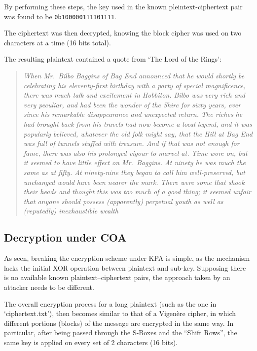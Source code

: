 \documentclass[12pt]{article}
\begin{document}
By performing these steps, the key used in the known pleintext-ciphertext pair was found to be \verb|0b100000111101111|.

The ciphertext was then decrypted, knowing the block cipher was used on two characters at a time (16 bits total).

The resulting plaintext contained a quote from `The Lord of the Rings':

\begin{quote}
   \textit{When Mr.\ Bilbo Baggins of Bag End announced that he would shortly be celebrating his eleventy-first birthday with a party of special magnificence, there was much talk and excitement in Hobbiton. 
   Bilbo was very rich and very peculiar, and had been the wonder of the Shire for sixty years, ever since his remarkable disappearance and unexpected return. 
   The riches he had brought back from his travels had now become a local legend, and it was popularly believed, whatever the old folk might say, that the Hill at Bag End was full of tunnels stuffed with treasure. 
   And if that was not enough for fame, there was also his prolonged vigour to marvel at. Time wore on, but it seemed to have little effect on Mr.\ Baggins.
   At ninety he was much the same as at fifty. 
   At ninety-nine they began to call him well-preserved, but unchanged would have been nearer the mark. 
   There were some that shook their heads and thought this was too much of a good thing; it seemed unfair that anyone should possess (apparently) perpetual youth as well as (reputedly) inexhaustible wealth}
\end{quote}

\subsection{Decryption under COA}
\label{sec:03.1}

As seen, breaking the encryption scheme under KPA is simple, as the mechanism lacks the initial XOR operation between plaintext and sub-key.
Supposing there is no available known plaintext–ciphertext pairs, the approach taken by an attacker needs to be different.

The overall encryption process for a long plaintext (such as the one in `ciphertext.txt'), then becomes similar to that of a Vigenère cipher, in which different portions (blocks) of the message are encrypted in the same way. In particular, after being passed through the S-Boxes and the ``Shift Rows'', the same key is applied on every set of 2 characters (16 bits).
\label{sec:01}
\end{document}
